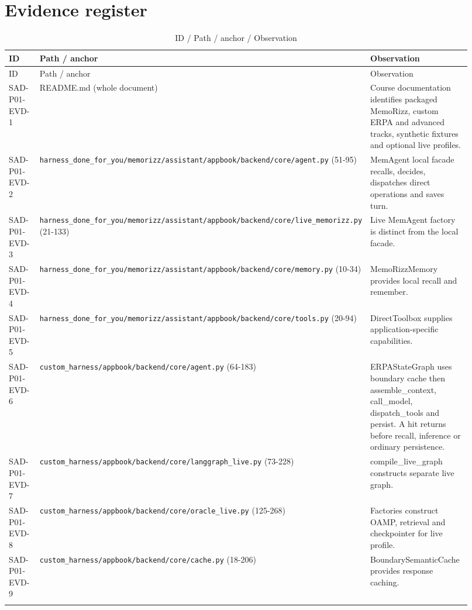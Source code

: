 \documentclass[10pt,letterpaper]{article}
\begin{document}
\section{Evidence register}
\begin{longtable}{@{}>{\raggedright\arraybackslash}p{0.17\linewidth}>{\raggedright\arraybackslash}p{0.34\linewidth}>{\raggedright\arraybackslash}p{0.41\linewidth}@{}}
\caption{ID / Path / anchor / Observation}\\
\toprule ID & Path / anchor & Observation\\\midrule\endfirsthead
\toprule ID & Path / anchor & Observation\\\midrule\endhead
SAD-P01-EVD-1 & README.md (whole document) & Course documentation identifies packaged MemoRizz, custom ERPA and advanced tracks, synthetic fixtures and optional live profiles.\\\addlinespace
SAD-P01-EVD-2 & \nolinkurl{harness_done_for_you/memorizz/assistant/appbook/backend/core/agent.py} (51-95) & MemAgent local facade recalls, decides, dispatches direct operations and saves turn.\\\addlinespace
SAD-P01-EVD-3 & \nolinkurl{harness_done_for_you/memorizz/assistant/appbook/backend/core/live_memorizz.py} (21-133) & Live MemAgent factory is distinct from the local facade.\\\addlinespace
SAD-P01-EVD-4 & \nolinkurl{harness_done_for_you/memorizz/assistant/appbook/backend/core/memory.py} (10-34) & MemoRizzMemory provides local recall and remember.\\\addlinespace
SAD-P01-EVD-5 & \nolinkurl{harness_done_for_you/memorizz/assistant/appbook/backend/core/tools.py} (20-94) & DirectToolbox supplies application-specific capabilities.\\\addlinespace
SAD-P01-EVD-6 & \nolinkurl{custom_harness/appbook/backend/core/agent.py} (64-183) & ERPAStateGraph uses boundary cache then assemble\_context, call\_model, dispatch\_tools and persist. A hit returns before recall, inference or ordinary persistence.\\\addlinespace
SAD-P01-EVD-7 & \nolinkurl{custom_harness/appbook/backend/core/langgraph_live.py} (73-228) & compile\_live\_graph constructs separate live graph.\\\addlinespace
SAD-P01-EVD-8 & \nolinkurl{custom_harness/appbook/backend/core/oracle_live.py} (125-268) & Factories construct OAMP, retrieval and checkpointer for live profile.\\\addlinespace
SAD-P01-EVD-9 & \nolinkurl{custom_harness/appbook/backend/core/cache.py} (18-206) & BoundarySemanticCache provides response caching.\\\addlinespace

\end{longtable}
\end{document}
